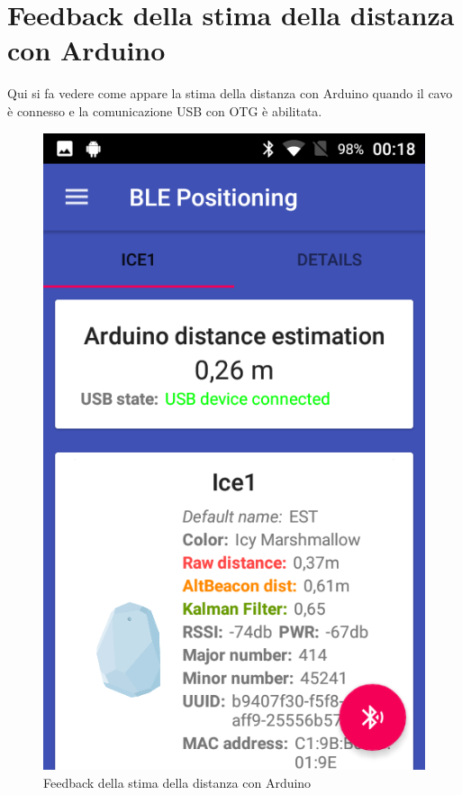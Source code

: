 \section{Feedback della stima della distanza con Arduino}
Qui si fa vedere come appare la stima della distanza con Arduino quando il cavo è connesso e la comunicazione USB con OTG è abilitata.
\begin{figure}[ph]
	\centering
	\includegraphics[width=.35\linewidth]{img/app/12.png}
	\caption{Feedback della stima della distanza con Arduino}
\end{figure}